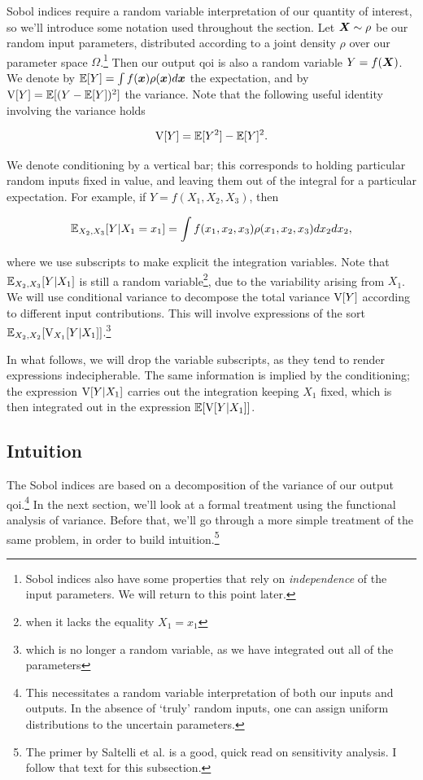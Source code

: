 \documentclass[../primer.tex]{subfiles}
\begin{document}
Sobol indices require a random variable interpretation of our quantity of
interest, so we'll introduce some notation used throughout the section. Let
\(\boldsymbol{X}\sim\rho\) be our random input parameters, distributed according to a joint
density \(\rho\) over our parameter space \(\Omega\).\footnote{Sobol indices also have
some properties that rely on \emph{independence} of the input parameters. We will
return to this point later.} Then our output qoi is also a random variable
\(Y=f(\boldsymbol{X})\). We denote by \(\mathbb{E}[Y] = \int f(\boldsymbol{x})\rho(\boldsymbol{x})d\boldsymbol{x}\) the expectation, and
by \(\mathrm{V}[Y]=\mathbb{E}[(Y-\mathbb{E}[Y])^2]\) the variance. Note that the following useful identity
involving the variance holds

\begin{equation}
  \mathrm{V}[Y] = \mathbb{E}[Y^2] - \mathbb{E}[Y]^2.
\end{equation}

We denote conditioning by a vertical bar; this corresponds to holding particular
random inputs fixed in value, and leaving them out of the integral for a
particular expectation. For example, if \(Y=f(X_1,X_2,X_3)\), then

\begin{equation}
  \mathbb{E}_{X_2,X_3}[Y|X_1=x_1] = \int f(x_1,x_2,x_3)\rho(x_1,x_2,x_3)dx_2dx_2,
\end{equation}

\noindent where we use subscripts to make explicit the integration variables.
Note that \(\mathbb{E}_{X_2,X_3}[Y|X_1]\) is still a random variable\footnote{when it lacks the
equality \(X_1=x_1\)}, due to the variability arising from \(X_1\). We will use
conditional variance to decompose the total variance \(\mathrm{V}[Y]\) according to
different input contributions. This will involve expressions of the sort
\(\mathbb{E}_{X_2,X_2}[\mathrm{V}_{X_1}[Y|X_1]]\).\footnote{which is no longer a random variable, as we
have integrated out all of the parameters}

In what follows, we will drop the variable subscripts, as they tend to render
expressions indecipherable. The same information is implied by the conditioning;
the expression \(\mathrm{V}[Y|X_1]\) carries out the integration keeping \(X_1\) fixed,
which is then integrated out in the expression \(\mathbb{E}[\mathrm{V}[Y|X_1]]\).

\subsection{Intuition}
\label{sec:orge6ee014}
The Sobol indices are based on a decomposition of the variance of our output
qoi.\footnote{This necessitates a random variable interpretation of both our inputs
and outputs. In the absence of `truly' random inputs, one can assign uniform
distributions to the uncertain parameters.} In the next section, we'll look at a
formal treatment using the functional analysis of variance. Before that, we'll
go through a more simple treatment of the same problem, in order to build
intuition.\footnote{The primer by Saltelli et al.\cite{saltelli2004sensitivity} is a
good, quick read on sensitivity analysis. I follow that text for this
subsection.}
\end{document}
